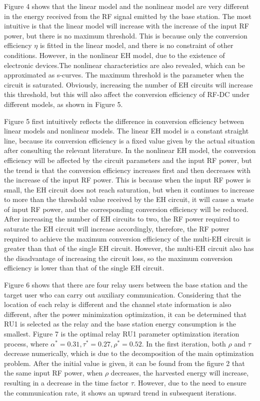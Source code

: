 \documentclass[conference]{IEEEtran}
\begin{document}
Figure 4 shows that the linear model and the nonlinear model are very different in the energy received from the RF signal emitted by the base station. The most intuitive is that the linear model will increase with the increase of the input RF power, but there is no maximum threshold. This is because only the conversion efficiency $\eta$ is fitted in the linear model, and there is no constraint of other conditions. However, in the nonlinear EH model, due to the existence of electronic devices.The nonlinear characteristics are also revealed, which can be approximated as s-curves. The maximum threshold is the parameter when the circuit is saturated. Obviously, increasing the number of EH circuits will increase this threshold, but this will also affect the conversion efficiency of RF-DC under different models, as shown in Figure 5.

Figure 5 first intuitively reflects the difference in conversion efficiency between linear models and nonlinear models. The linear EH model is a constant straight line, because its conversion efficiency is a fixed value given by the actual situation after consulting the relevant literature. In the nonlinear EH model, the conversion efficiency will be affected by the circuit parameters and the input RF power, but the trend is that the conversion efficiency increases first and then decreases with the increase of the input RF power. This is because when the input RF power is small, the EH circuit does not reach saturation, but when it continues to increase to more than the threshold value received by the EH circuit, it will cause a waste of input RF power, and the corresponding conversion efficiency will be reduced.
After increasing the number of EH circuits to two, the RF power required to saturate the EH circuit will increase accordingly, therefore, the RF power required to achieve the maximum conversion efficiency of the multi-EH circuit is greater than that of the single EH circuit.
However, the multi-EH circuit also has the disadvantage of increasing the circuit loss, so the maximum conversion efficiency is lower than that of the single EH circuit.


Figure 6 shows that there are four relay users between the base station and the target user who can carry out auxiliary communication. Considering that the location of each relay is different and the channel state information is also different, after the power minimization optimization, it can be determined that RU1 is selected as the relay and the base station energy consumption is the smallest. Figure 7 is the optimal relay RU1 parameter optimization iteration process, where $\alpha ^{\ast }=0.31 , \tau^{\ast }=0.27 , \rho^{\ast }=0.52$. In the first iteration, both $\rho$ and $\tau$ decrease numerically, which is due to the decomposition of the main optimization problem. After the initial value is given, it can be found from the figure 2 that the same input RF power, when $\rho$ decreases, the harvested energy will increase, resulting in a decrease in the time factor $\tau$. However, due to the need to ensure the communication rate, it shows an upward trend in subsequent iterations. 
\end{document}
